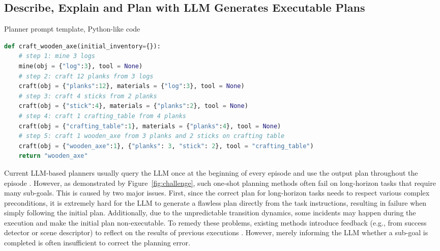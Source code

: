 \documentclass{article}
\begin{document}
\subsection{Describe, Explain and Plan with LLM Generates Executable Plans}
\label{sec:descriptor}

\begin{algorithm}[t]
\caption{Planner prompt template, Python-like code}
\label{alg:prompt}
\begin{lstlisting}[language=python]  
def craft_wooden_axe(initial_inventory={}):
    # step 1: mine 3 logs
    mine(obj = {"log":3}, tool = None) 
    # step 2: craft 12 planks from 3 logs
    craft(obj = {"planks":12}, materials = {"log":3}, tool = None) 
    # step 3: craft 4 sticks from 2 planks
    craft(obj = {"stick":4}, materials = {"planks":2}, tool = None) 
    # step 4: craft 1 crafting_table from 4 planks
    craft(obj = {"crafting_table":1}, materials = {"planks":4}, tool = None) 
    # step 5: craft 1 wooden_axe from 3 planks and 2 sticks on crafting table
    craft(obj = {"wooden_axe":1}, {"planks": 3, "stick": 2}, tool = "crafting_table") 
    return "wooden_axe"
\end{lstlisting}
\vspace{-0.1 in}
\end{algorithm}

Current LLM-based planners usually query the LLM once at the beginning of every episode and use the output plan throughout the episode \cite{huang2022language,progprompt}.
However, as demonstrated by Figure~\ref{fig:challenge}, such one-shot planning methods often fail on long-horizon tasks that require many sub-goals.
This is caused by two major issues.
First, since the correct plan for long-horizon tasks needs to respect various complex preconditions, it is extremely hard for the LLM to generate a flawless plan directly from the task instructions, resulting in failure when simply following the initial plan. 
Additionally, due to the unpredictable transition dynamics, some incidents may happen during the execution and make the initial plan non-executable.
To remedy these problems, existing methods introduce feedback (e.g., from success detector or scene descriptor) to reflect on the results of previous executions \cite{innermonologue,codeaspolicies,saycan}. 
However, merely informing the LLM whether a sub-goal is completed is often insufficient to correct the planning error.
\end{document}
